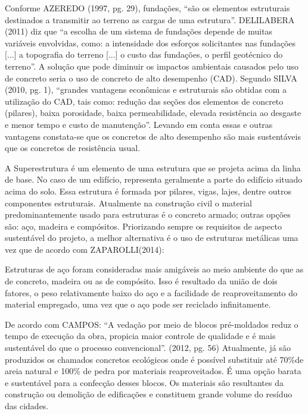 Conforme AZEREDO (1997, pg. 29), fundações, “são os elementos estruturais destinados a transmitir ao terreno as cargas de uma estrutura”. DELILABERA (2011) diz que “a escolha de um sistema de fundações depende de muitas variáveis envolvidas, como: a intensidade dos esforços solicitantes nas fundações [...] a topografia do terreno [...] o custo das fundações, o perfil geotécnico do terreno”. A solução que pode diminuir os impactos ambientais causados pelo uso de concreto seria o uso de concreto de alto desempenho (CAD). Segundo SILVA (2010, pg. 1), “grandes vantagens econômicas e estruturais são obtidas com a utilização do CAD, tais como: redução das seções dos elementos de concreto (pilares), baixa porosidade, baixa permeabilidade, elevada resistência ao desgaste e menor tempo e custo de manutenção”. Levando em conta essas e outras vantagens constata-se que os concretos de alto desempenho são mais sustentáveis que os concretos de resistência usual.

A Superestrutura é um elemento de uma estrutura que se projeta acima da linha de base. No caso de um edifício, representa geralmente a parte do edifício situado acima do solo. Essa estrutura é formada por pilares, vigas, lajes, dentre outros componentes estruturais. Atualmente na construção civil o material predominantemente usado para estruturas é o concreto armado; outras opções são: aço, madeira e compósitos. Priorizando sempre os requisitos de aspecto sustentável do projeto, a melhor alternativa é o uso de estruturas metálicas uma vez que de acordo com ZAPAROLLI(2014):

\begin{citacao}
Estruturas de aço foram consideradas mais amigáveis ao meio ambiente do que as de concreto, madeira ou as de compósito. Isso é resultado da união de dois fatores, o peso relativamente baixo do aço e a facilidade de reaproveitamento do material empregado, uma vez que o aço pode ser reciclado infinitamente.
\end{citacao}


De acordo com CAMPOS: “A vedação por meio de blocos pré-moldados reduz o tempo de execução da obra, propicia maior controle de qualidade e é mais sustentável do que o processo convencional”. (2012, pg. 56) Atualmente, já são produzidos os chamados concretos ecológicos onde é possível substituir até 70\%de areia natural e 100\% de pedra por materiais reaproveitados. É uma opção barata e sustentável para a confecção desses blocos. Os materiais são resultantes da construção ou demolição de edificações e constituem grande volume do resíduo das cidades.

